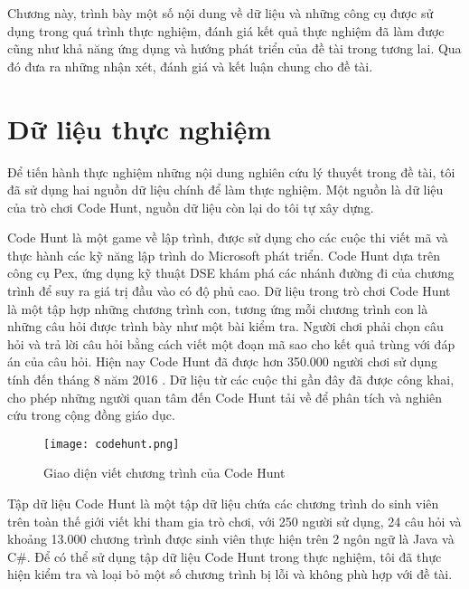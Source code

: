 
Chương này, trình bày một số nội dung về dữ liệu và những công cụ được
sử dụng trong quá trình thực nghiệm, đánh giá kết quả thực nghiệm đã 
làm được cũng như khả năng ứng dụng và hướng phát triển của đề tài 
trong tương lai. Qua đó đưa ra những nhận xét, đánh giá và kết luận 
chung cho đề tài.

\section{Dữ liệu thực nghiệm}

Để tiến hành thực nghiệm những nội dung nghiên cứu lý thuyết trong đề
tài, tôi đã sử dụng hai nguồn dữ liệu chính để làm thực nghiệm. Một
nguồn là dữ liệu của trò chơi Code Hunt, nguồn dữ liệu còn lại do tôi
tự xây dựng.

Code Hunt là một game về lập trình, được sử dụng cho
các cuộc thi viết mã và thực hành các kỹ năng lập trình do Microsoft
phát triển. Code Hunt dựa trên công cụ Pex, ứng dụng kỹ thuật DSE khám
phá các nhánh đường đi của chương trình để suy ra giá trị đầu vào có
độ phủ cao. Dữ liệu trong trò chơi Code Hunt là một tập hợp những
chương trình con, tương ứng mỗi chương trình con là những câu hỏi được
trình bày như một bài kiểm tra. Người chơi phải chọn câu hỏi và trả
lời câu hỏi bằng cách viết một đoạn mã sao cho kết quả trùng với
đáp án của câu hỏi. Hiện nay Code Hunt đã được hơn 350.000 người chơi
sử dụng tính đến tháng 8 năm 2016 \cite{CodeHunt}. Dữ liệu từ các cuộc 
thi gần đây đã được công khai, cho phép những người quan tâm đến 
Code Hunt tải về để phân tích và nghiên cứu trong cộng đồng giáo dục.

\label{sec:data}
\begin{center}
  \begin{figure}[H]
    \begin{center}
      \texttt{[image: codehunt.png]}
    \end{center}
    \caption{Giao diện viết chương trình của Code Hunt}
    \label{codehunt2}
  \end{figure}
\end{center}

Tập dữ liệu Code Hunt là một tập dữ liệu chứa các chương trình do sinh 
viên trên toàn thế giới viết khi tham gia trò chơi, với 250 người sử dụng, 
24 câu hỏi và khoảng 13.000 chương trình được sinh viên thực hiện trên 2 
ngôn ngữ là Java và C\#. Để có thể sử dụng tập dữ liệu Code Hunt trong 
thực nghiệm, tôi đã thực hiện kiểm tra và loại bỏ một số chương trình bị 
lỗi và không phù hợp với đề tài.

